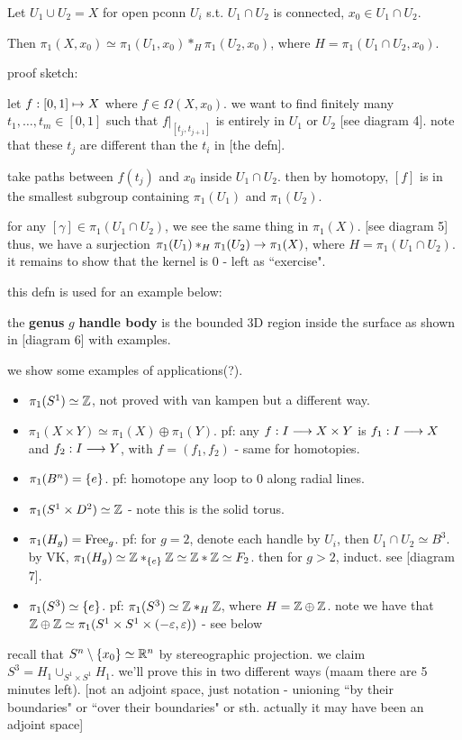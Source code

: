\begin{thm}[title=Van Kampen's Theorem]
    Let $U_{1}\cup U_{2}=X$ for open pconn $U_{i}$ s.t.
    $U_{1}\cap U_{2}$ is connected, $x_{0}\in U_{1}\cap U_{2}$.

    Then $\pi_{1}(X,x_{0})\simeq\pi_{1}(U_{1},x_{0})*_{H}\pi_{1}(U_{2},x_{0})$,
    where $H=\pi_{1}(U_{1}\cap U_{2},x_{0})$.
\end{thm}
proof sketch:

let $f:[0,1]\mapsto X$ where $f\in\Omega(X,x_{0})$.
we want to find finitely many $t_{1},\dots,t_{m}\in[0,1]$
such that $f\rvert_{[t_{j},t_{j+1}]}$ is entirely in $U_{1}$ or $U_{2}$
[see diagram 4].
note that these $t_{j}$ are different than the $t_{i}$ in [the defn].

take paths between $f(t_{j})$ and $x_{0}$ inside $U_{1}\cap U_{2}$.
then by homotopy, $[f]$ is in the smallest subgroup containing $\pi_{1}(U_{1})$
and $\pi_{1}(U_{2})$.

for any $[\gamma]\in\pi_{1}(U_{1}\cap U_{2})$, we see the same thing in
$\pi_{1}(X)$. [see diagram 5]
thus, we have a surjection $\pi_{1}(U_{1})*_{H}\pi_{1}(U_{2})\rightarrow\pi_{1}(X)$,
where $H=\pi_{1}(U_{1}\cap U_{2})$.
it remains to show that the kernel is 0 - left as ``exercise".

this defn is used for an example below:
\begin{defn}
    the \textbf{genus} $g$ \textbf{handle body} is the bounded 3D region inside
    the surface as shown in [diagram 6] with examples.
\end{defn}

we show some examples of applications(?).
\begin{itemize}
    \item $\pi_{1}(S^{1})\simeq\mathbb{Z}$, not proved with van kampen but a different
        way.
    \item $\pi_{1}(X\times Y)\simeq \pi_{1}(X)\oplus\pi_{1}(Y)$.
        pf: any $f:I\longrightarrow X\times Y$ is $f_{1}:I\longrightarrow X$ and $f_{2}:I\longrightarrow Y$,
        with $f=(f_{1},f_{2})$ - same for homotopies.
    \item $\pi_{1}(B^{n})=\left\{{e}\right\}$.
        pf: homotope any loop to $0$ along radial lines.
    \item $\pi_{1}(S^{1}\times D^{2})\simeq\mathbb{Z}$ - note this is the solid torus.
    \item $\pi_{1}(H_{g})=\textrm{Free}_{g}$.
        pf: for $g=2$, denote each handle by $U_{i}$, then $U_{1}\cap U_{2}
        \simeq B^{3}$.
        by VK, $\pi_{1}(H_{g})\simeq\mathbb{Z}*_{\left\{{e}\right\}}\mathbb{Z}\simeq\mathbb{Z}*\mathbb{Z}\simeq F_{2}$.
        then for $g>2$, induct. see [diagram 7].
    \item $\pi_{1}(S^{3})\simeq\left\{{e}\right\}$.
        pf: $\pi_{1}(S^{3})\simeq\mathbb{Z}*_{H}\mathbb{Z}$, where $H=\mathbb{Z}\oplus\mathbb{Z}$.
        note we have that
        $\mathbb{Z}\oplus\mathbb{Z}\simeq\pi_{1}(S^{1}\times S^{1}\times(-\varepsilon,\varepsilon))$ -
        see below
\end{itemize}
recall that $S^{n}\setminus\left\{{x_{0}}\right\}\simeq\mathbb{R}^{n}$ by stereographic projection.
we claim $S^{3}=H_{1}\cup_{S^{1}\times S^{1}}H_{1}$.
we'll prove this in two different ways (maam there are 5 minutes left).
[not an adjoint space, just notation - unioning ``by their boundaries" or
``over their boundaries" or sth. actually it may have been an adjoint space]

